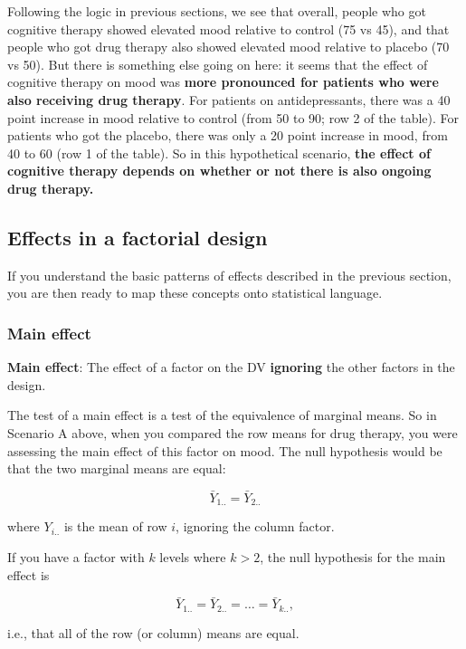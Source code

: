 \documentclass[]{book}
\begin{document}
Following the logic in previous sections, we see that overall, people who got cognitive therapy showed elevated mood relative to control (75 vs 45), and that people who got drug therapy also showed elevated mood relative to placebo (70 vs 50). But there is something else going on here: it seems that the effect of cognitive therapy on mood was \textbf{more pronounced for patients who were also receiving drug therapy}. For patients on antidepressants, there was a 40 point increase in mood relative to control (from 50 to 90; row 2 of the table). For patients who got the placebo, there was only a 20 point increase in mood, from 40 to 60 (row 1 of the table). So in this hypothetical scenario, \textbf{the effect of cognitive therapy depends on whether or not there is also ongoing drug therapy.}

\hypertarget{effects-in-a-factorial-design}{%
\subsection{Effects in a factorial design}\label{effects-in-a-factorial-design}}

If you understand the basic patterns of effects described in the previous section, you are then ready to map these concepts onto statistical language.

\hypertarget{main-effect}{%
\subsubsection{Main effect}\label{main-effect}}

\textbf{Main effect}: The effect of a factor on the DV \textbf{ignoring} the other factors in the design.

The test of a main effect is a test of the equivalence of marginal means. So in Scenario A above, when you compared the row means for drug therapy, you were assessing the main effect of this factor on mood. The null hypothesis would be that the two marginal means are equal:

\[\bar{Y}_{1..} = \bar{Y}_{2..}\]

where \(Y_{i..}\) is the mean of row \(i\), ignoring the column factor.

If you have a factor with \(k\) levels where \(k > 2\), the null hypothesis for the main effect is

\[\bar{Y}_{1..} = \bar{Y}_{2..} = \ldots = \bar{Y}_{k..},\]

i.e., that all of the row (or column) means are equal.
\end{document}

